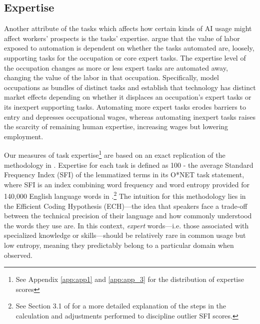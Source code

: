 \documentclass[11pt,a4paper]{article}
\begin{document}
\subsection{Expertise}

Another attribute of the tasks which affects how certain kinds of AI usage might affect workers' prospects is the tasks' expertise. \citet{NBERw33941} argue that the value of labor exposed to automation is dependent on whether the tasks automated are, loosely, supporting tasks for the occupation or core expert tasks. The expertise level of the occupation changes as more or less expert tasks are automated away, changing the value of the labor in that occupation. Specifically, \citet{NBERw33941} model occupations as bundles of distinct tasks and establish that technology has distinct market effects depending on whether it displaces an occupation's expert tasks or its inexpert supporting tasks. Automating more expert tasks erodes barriers to entry and depresses occupational wages, whereas automating inexpert tasks raises the scarcity of remaining human expertise, increasing wages but lowering employment.

Our measures of task expertise\footnote{See Appendix \ref{app:app1} and \ref{app:app_3} for the distribution of expertise scores} are based on an exact replication of the methodology in \citet{NBERw33941}. Expertise for each task is defined as 100 - the average Standard Frequency Index (SFI) of the lemmatized terms in its O*NET task statement, where SFI is an index combining word frequency and word entropy provided for 140,000 English language words in \citet{Zeno1995-sf}.\footnote{See Section 3.1 of \citet{NBERw33941} for a more detailed explanation of the steps in the calculation and adjustments performed to discipline outlier SFI scores.} The intuition for this methodology lies in the Efficient Coding Hypothesis (ECH)---the idea that speakers face a trade-off between the technical precision of their language and how commonly understood the words they use are. In this context, \textit{expert} words---i.e. those associated with specialized knowledge or skills---should be relatively rare in common usage but low entropy, meaning they predictably belong to a particular domain when observed.
\end{document}
